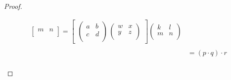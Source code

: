 \documentclass[11pt,a4paper]{article}
\theoremstyle{definition}
\begin{document}
\begin{proof}
\begin{enumerate}
\begin{enumerate}
\begin{align*}
\begin{bmatrix}
   m & n\\
   \end{bmatrix}
    = \begin{bmatrix}
   \begin{pmatrix}
   a & b\\
   c & d\\
   \end{pmatrix}\, \begin{pmatrix}
   w & x\\
   y & z\\
   \end{pmatrix}
   \end{bmatrix}\begin{pmatrix}
   k & l\\
   m & n\\
   \end{pmatrix}\\\\
   &  = (p\cdot q)\cdot r\\  
     \end{align*}
     

\end{enumerate}
\end{enumerate}
\end{proof}
\end{document}
